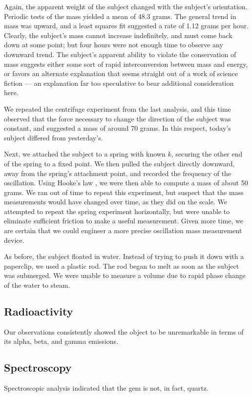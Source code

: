 \documentclass[10pt]{article}
\begin{document}
Again, the apparent weight of the subject changed with the subject's orientation.
Periodic tests of the mass yielded a mean of 48.3 grams.
The general trend in mass was upward, and a least squares fit suggested a rate of 1.12 grams per hour.
Clearly, the subject's mass cannot increase indefinitely, and must come back down at some point; but four hours were not enough time to observe any downward trend.
The subject's apparent ability to violate the conservation of mass suggests either some sort of rapid interconversion between mass and energy, or favors an alternate explanation that seems straight out of a work of science fiction --- an explanation far too speculative to bear additional consideration here.

We repeated the centrifuge experiment from the last analysis, and this time observed that the force necessary to change the direction of the subject was constant, and suggested a mass of around 70 grams.
In this respect, today's subject differed from yesterday's.

Next, we attached the subject to a spring with known $k$, securing the other end of the spring to a fixed point.
We then pulled the subject directly downward, away from the spring's attachment point, and recorded the frequency of the oscillation.
Using Hooke's law \citep{Hooke1679}, we were then able to compute a mass of about 50 grams.
We ran out of time to repeat this experiment, but suspect that the mass measurements would have changed over time, as they did on the scale.
We attempted to repeat the spring experiment horizontally, but were unable to eliminate sufficient friction to make a useful measurement.
Given more time, we are certain that we could engineer a more precise oscillation mass measurement device.

As before, the subject floated in water.
Instead of trying to push it down with a paperclip, we used a plastic rod.
The rod began to melt as soon as the subject was submerged.
We were unable to measure a volume due to rapid phase change of the water to steam.

\subsection{Radioactivity}
Our observations consistently showed the object to be unremarkable in terms of its alpha, beta, and gamma emissions.

\subsection{Spectroscopy}
Spectroscopic analysis indicated that the gem is not, in fact, quartz.
\end{document}
